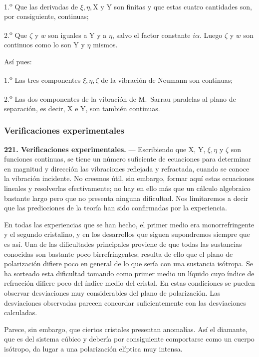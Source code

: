 1.\textsuperscript{o} Que las derivadas de $\xi,\eta,\mathrm{X}$ y $\mathrm{Y}$ son
finitas y que estas cuatro cantidades son, por consiguiente, continuas;

2.\textsuperscript{o} Que $\zeta$ y $w$ son iguales a $\mathrm{Y}$ y a $\eta$, salvo
el factor constante $i\alpha$. Luego $\zeta$ y $w$ son continuos como lo
son $\mathrm{Y}$ y $\eta$ mismos.

Así pues:

1.\textsuperscript{o} Las tres componentes $\xi,\eta,\zeta$ de la vibración de Neumann
son continuas;

2.\textsuperscript{o} Las dos componentes de la vibración de M.~Sarrau paralelas al
plano de separación, es decir, X e Y, son también continuas.

\subsubsection{Verificaciones experimentales}

\noindent\textbf{221. Verificaciones experimentales.} — Escribiendo que
X, Y, $\xi,\eta$ y $\zeta$ son funciones continuas, se tiene un número
suficiente de ecuaciones para determinar en magnitud y dirección las
vibraciones reflejada y refractada, cuando se conoce la vibración
incidente. No creemos útil, sin embargo, formar aquí estas ecuaciones
lineales y resolverlas efectivamente; no hay en ello más que un cálculo
algebraico bastante largo pero que no presenta ninguna dificultad. Nos
limitaremos a decir que las predicciones de la teoría han sido
confirmadas por la experiencia.

En todas las experiencias que se han hecho, el primer medio era
monorrefringente y el segundo cristalino, y en los desarrollos que
siguen supondremos siempre que es así. Una de las dificultades
principales proviene de que todas las sustancias conocidas son bastante
poco birrefringentes; resulta de ello que el plano de polarización
difiere poco en general de lo que sería con una sustancia isótropa. Se
ha sorteado esta dificultad tomando como primer medio un líquido cuyo
índice de refracción difiere poco del índice medio del cristal. En estas
condiciones se pueden observar desviaciones muy considerables del plano
de polarización. Las desviaciones observadas parecen concordar
suficientemente con las desviaciones calculadas.

Parece, sin embargo, que ciertos cristales presentan anomalías. Así el
diamante, que es del sistema cúbico y debería por consiguiente
comportarse como un cuerpo isótropo, da lugar a una polarización
elíptica muy intensa.

